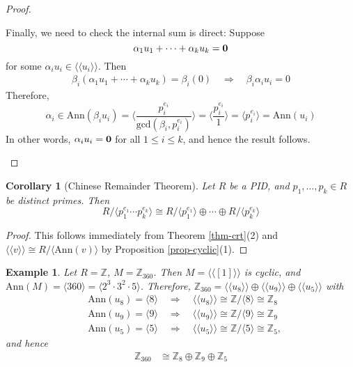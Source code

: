 \documentclass[12pt]{amsbook}
\newtheorem{corollary}[theorem]{Corollary}
\newtheorem{example}[theorem]{Example}
\begin{document}
\begin{proof}
\begin{enumerate}
        Finally, we need to check the internal sum is direct: Suppose $$\alpha_1u_1+\cdots+\alpha_ku_k= {\bf 0}$$ 
        for some $\alpha_iu_i\in\langle\langle u_i\rangle\rangle$. Then
        \begin{align*}
            \beta_i(\alpha_1u_1+\cdots+\alpha_ku_k)=\beta_i(0) \quad \Rightarrow \quad \beta_i\alpha_iu_i=0
        \end{align*}
            Therefore, 
            $$\alpha_i \in\mathrm{Ann}(\beta_iu_i) =\langle\frac{p_i^{e_i}}{\mathrm{gcd}(\beta_i , p_i^{e_i})}\rangle =\langle\frac{p_i^{e_i}}{1}\rangle =\langle p_i^{e_i}\rangle =\mathrm{Ann}(u_i)$$
         In other words, $\alpha_iu_i = {\bf 0}$ for all $1 \leq i \leq k$,  
        and hence the result follows.
    \end{enumerate}
\end{proof}

\begin{corollary}[Chinese Remainder Theorem] \label{cor-crt}
    Let $R$ be a PID, and $p_1, \dots, p_k \in R$ be distinct primes. Then 
    $$R/\langle p_1^{e_1} \cdots p_k^{e_k} \rangle  \cong R/\langle p_1^{e_1} \rangle \oplus \cdots \oplus R/\langle p_k^{e_k} \rangle$$
\end{corollary}
\begin{proof}
    This follows immediately from Theorem \ref{thm-crt}(2) and $\langle \langle v \rangle \rangle \cong R/\langle \mathrm{Ann}(v) \rangle$ by Proposition \ref{prop-cyclic}(1).
\end{proof}

\begin{example}
    Let $R=\mathbb{Z}$, $M=\mathbb{Z}_{360}$. Then $M=\langle\langle[1]\rangle\rangle$ is cyclic, and $\mathrm{Ann}(M)=\langle 360\rangle=\langle2^3\cdot 3^2\cdot5\rangle$. Therefore, $\mathbb{Z}_{360}=\langle\langle u_8\rangle\rangle\oplus\langle\langle u_9\rangle\rangle\oplus\langle\langle 
    u_5\rangle\rangle$ with
    \begin{align*}
        &\mathrm{Ann}(u_8)=\langle8\rangle \quad\Rightarrow\quad\langle\langle u_8\rangle\rangle\cong\mathbb{Z}/\langle8\rangle \cong\mathbb{Z}_8\\
        &\mathrm{Ann}(u_9)=\langle9\rangle \quad\Rightarrow\quad\langle\langle u_9\rangle\rangle\cong\mathbb{Z}/\langle9\rangle \cong\mathbb{Z}_9\\
        &\mathrm{Ann}(u_5)=\langle5\rangle \quad\Rightarrow\quad\langle\langle u_5\rangle\rangle\cong\mathbb{Z}/\langle5\rangle \cong\mathbb{Z}_5,
    \end{align*}and hence
    \begin{align*}
        \mathbb{Z}_{360} &\cong\mathbb{Z}_8\oplus\mathbb{Z}_9\oplus\mathbb{Z}_5
    \end{align*}
\end{example}
\end{document}

